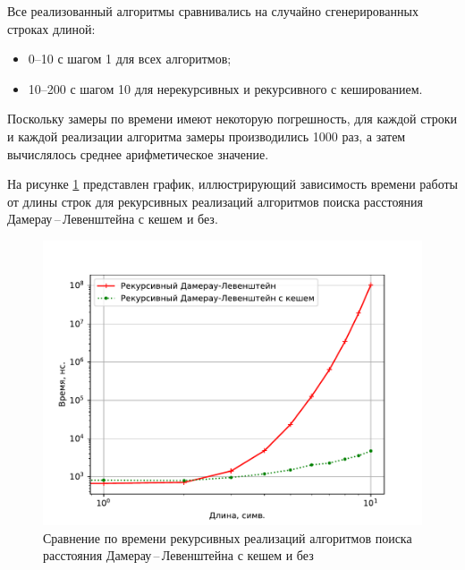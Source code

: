 Все реализованный алгоритмы сравнивались на случайно сгенерированных строках длиной:
\begin{itemize}
	\item 0--10 с шагом 1 для всех алгоритмов;
	\item 10--200 с шагом 10 для нерекурсивных и рекурсивного с кешированием. 
\end{itemize}

Поскольку замеры по времени имеют некоторую погрешность, для каждой строки и каждой реализации алгоритма замеры производились 1000 раз, а затем вычислялось среднее арифметическое значение.

На рисунке \ref{plt:time_01} представлен график, иллюстрирующий зависимость времени работы от длины строк для рекурсивных реализаций алгоритмов поиска расстояния Дамерау\,--\,Левенштейна с кешем и без.
\begin{figure}[H]
	\centering
	\includegraphics[height=0.5\textheight, page=1]{img/figures.pdf}
	\caption{Сравнение по времени рекурсивных реализаций алгоритмов поиска расстояния Дамерау\,--\,Левенштейна с кешем и без}
	\label{plt:time_01}
\end{figure}

